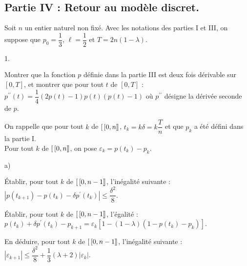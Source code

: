 \documentclass[11pt]{article}%
\begin{document}
\subsection*{Partie IV : Retour au modèle discret.}

Soit $n$ un entier naturel non fixé. Avec les notations des parties I
et
III, on suppose que $p_{0} = \dfrac{1}{3}$, $\ell = \dfrac{1}{2}$ et $T
= 2n(1-\lambda )$.

\begin{noliste}{1.}
 \setlength{\itemsep}{4mm}
\item Montrer que la fonction $p$ définie dans la partie III est deux
fois dérivable sur $[0,T]$, et montrer que pour tout $t$ de $[0,T]$ :
\qquad $p^{\prime \prime }(t) = \dfrac{1}{4}(2p(t)-1)p(t)(p(t)-1)$
\quad où $p^{\prime
\prime }$ désigne la dérivée seconde de $p$.

\item On rappelle que pour tout $k$ de $[ \
\hspace{-0.15em}[0,n]\hspace{-0.13em}]$, \quad $t_{k} = k\delta =
k\dfrac{T}{n}$ et que $p_{k}$ a été défini dans
la partie I.\\
Pour tout $k$ de $[ \ \hspace{-0.15em}[0,n]\hspace{-0.13em}]$, on pose
$\varepsilon_{k} = p(t_{k})-p_{k}$.

\begin{noliste}{a)}
 \setlength{\itemsep}{2mm}
\item Établir, pour tout $k$ de $[ \
\hspace{-0.15em}[0,n-1]\hspace{-0.13em}]$,
l'inégalité suivante : \quad $|p(t_{k + 1} ) -p(t_{k})-\delta p^{\prime
}(t_{k})|\leq \dfrac{\delta ^{2}}{8}$.

\item Établir, pour tout $k$ de $[ \
\hspace{-0.15em}[0,n-1]\hspace{-0.13em}]$,
l'égalité : $p(t_{k}) + \delta p^{\prime }(t_{k})-p_{k + 1} =
\varepsilon
_{k}[1-(1-\lambda )(1-p(t_{k})-p_{k})]$.

\item En déduire, pour tout $k$ de $[ \
\hspace{-0.15em}[0,n-1]\hspace{-0.13em}]
$, l'inégalité suivante : $|\varepsilon_{k + 1}|\leq \dfrac{\delta
^{2}}{8} + \dfrac{1}{3}(\lambda + 2)|\varepsilon_{k}|$.


\end{noliste}
\end{noliste}
\end{document}
